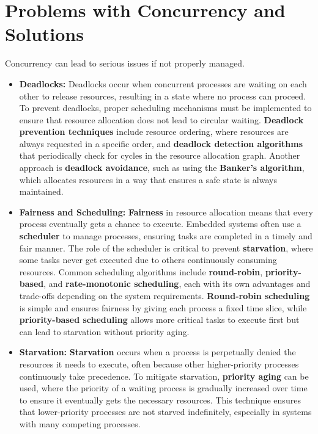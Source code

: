 \documentclass[
  14pt,
  a4paper,
  DIV=11,
  numbers=noendperiod,
  headinclude=true,
  footinclude=true]{scrreprt}
\begin{document}
\section{Problems with Concurrency and
Solutions}\label{problems-with-concurrency-and-solutions}

Concurrency can lead to serious issues if not properly managed.

\begin{itemize}
\item
  \textbf{Deadlocks:} Deadlocks occur when concurrent processes are
  waiting on each other to release resources, resulting in a state where
  no process can proceed. To prevent deadlocks, proper scheduling
  mechanisms must be implemented to ensure that resource allocation does
  not lead to circular waiting. \textbf{Deadlock prevention techniques}
  include resource ordering, where resources are always requested in a
  specific order, and \textbf{deadlock detection algorithms} that
  periodically check for cycles in the resource allocation graph.
  Another approach is \textbf{deadlock avoidance}, such as using the
  \textbf{Banker's algorithm}, which allocates resources in a way that
  ensures a safe state is always maintained.
\item
  \textbf{Fairness and Scheduling:} \textbf{Fairness} in resource
  allocation means that every process eventually gets a chance to
  execute. Embedded systems often use a \textbf{scheduler} to manage
  processes, ensuring tasks are completed in a timely and fair manner.
  The role of the scheduler is critical to prevent \textbf{starvation},
  where some tasks never get executed due to others continuously
  consuming resources. Common scheduling algorithms include
  \textbf{round-robin}, \textbf{priority-based}, and
  \textbf{rate-monotonic scheduling}, each with its own advantages and
  trade-offs depending on the system requirements. \textbf{Round-robin
  scheduling} is simple and ensures fairness by giving each process a
  fixed time slice, while \textbf{priority-based scheduling} allows more
  critical tasks to execute first but can lead to starvation without
  priority aging.
\item
  \textbf{Starvation:} \textbf{Starvation} occurs when a process is
  perpetually denied the resources it needs to execute, often because
  other higher-priority processes continuously take precedence. To
  mitigate starvation, \textbf{priority aging} can be used, where the
  priority of a waiting process is gradually increased over time to
  ensure it eventually gets the necessary resources. This technique
  ensures that lower-priority processes are not starved indefinitely,
  especially in systems with many competing processes.
\end{itemize}
\end{document}
